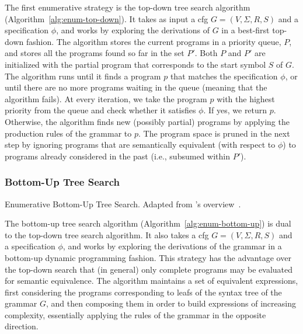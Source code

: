 The first enumerative strategy is the top-down tree search algorithm
(Algorithm~\ref{alg:enum-top-down}).
It takes as input a \gls{cfg} $G = (V, \Sigma{}, R, S)$ and a specification
$\phi{}$, and works by exploring the derivations of $G$ in a best-first top-down
fashion.
The algorithm stores the current programs in a priority queue, $P$, and stores
all the programs found so far in the set $P'$.
Both $P$ and $P'$ are initialized with the partial program that corresponds to
the start symbol $S$ of $G$.
The algorithm runs until it finds a program $p$ that matches the specification
$\phi{}$, or until there are no more programs waiting in the queue (meaning that
the algorithm fails).
At every iteration, we take the program $p$ with the highest priority from the
queue and check whether it satisfies $\phi{}$.
If yes, we return $p$.
Otherwise, the algorithm finds new (possibly partial) programs by applying the
production rules of the grammar to $p$.
The program space is pruned in the next step by ignoring programs that are
semantically equivalent (with respect to $\phi{}$) to programs already
considered in the past (i.e., subsumed within $P'$).

\subsubsection{Bottom-Up Tree Search}
\label{sec:bottom-up-tree-search}

\begin{algorithm}
  \DontPrintSemicolon
  \LinesNotNumbered




  \caption{Enumerative Bottom-Up Tree Search.
    Adapted from \citeauthor{Gulwani2017}'s overview~\cite{Gulwani2017}.}
  \label{alg:enum-bottom-up}
\end{algorithm}

The bottom-up tree search algorithm (Algorithm~\ref{alg:enum-bottom-up}) is dual
to the top-down tree search algorithm.
It also takes a \gls{cfg} $G = (V, \Sigma{}, R, S)$ and a specification
$\phi{}$, and works by exploring the derivations of the grammar in a bottom-up
dynamic programming fashion.
This strategy has the advantage over the top-down search that (in general) only
complete programs may be evaluated for semantic equivalence.
The algorithm maintains a set of equivalent expressions, first considering the
programs corresponding to leafs of the syntax tree of the grammar $G$, and then
composing them in order to build expressions of increasing complexity,
essentially applying the rules of the grammar in the opposite direction.

